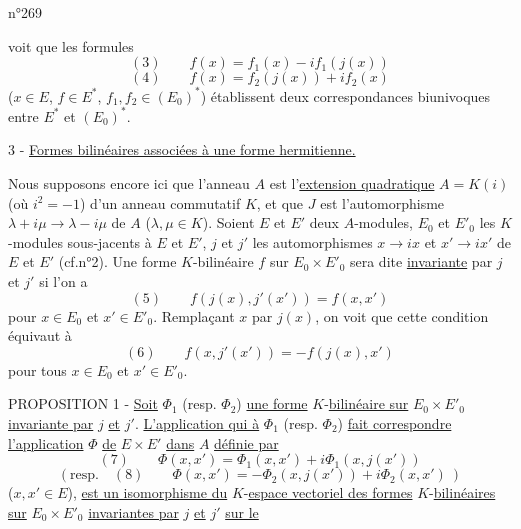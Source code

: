 \hfill n°269

voit que les formules
\[
(3)\qquad f(x)=f_1(x)-if_1(j(x))
\]
\[
(4)\qquad f(x)=f_2(j(x))+if_2(x)
\]
($x\in E$, $f\in E^*$, $f_1,f_2\in(E_0)^*$) établissent deux correspondances biunivoques entre $E^*$ et $(E_0)^*$.

3 - \uline{Formes bilinéaires associées à une forme hermitienne.}

Nous supposons encore ici que l'anneau $A$ est l'\uline{extension quadratique} $A=K(i)$ (où $i^2=-1$) d'un anneau commutatif $K$, et que $J$ est l'automorphisme $\lambda+i\mu\longrightarrow\lambda-i\mu$ de $A$ ($\lambda,\mu\in K$). Soient $E$ et $E'$ deux $A$-modules, $E_0$ et $E'_0$ les $K$-modules sous-jacents à $E$ et $E'$, $j$ et $j'$ les automorphismes $x\longrightarrow ix$ et $x'\longrightarrow ix'$ de $E$ et $E'$ (cf.n°2). Une forme $K$-bilinéaire $f$ sur $E_0\times E'_0$ sera dite \uline{invariante} par $j$ et $j'$ si l'on a
\[
(5)\qquad f(j(x),j'(x'))=f(x,x')
\]
pour $x\in E_0$ et $x'\in E'_0$. Remplaçant $x$ par $j(x)$, on voit que cette condition équivaut à
\[
(6)\qquad f(x,j'(x'))=-f(j(x),x')
\]
pour tous $x\in E_0$ et $x'\in E'_0$.

PROPOSITION 1 - \uline{Soit} $\Phi_1$ (resp. $\Phi_2$) \uline{une forme} $K$-\uline{bilinéaire sur} $E_0\times E'_0$ \uline{invariante par} $j$ \uline{et} $j'$. \uline{L'application qui à} $\Phi_1$ (resp. $\Phi_2$) \uline{fait correspondre l'application} $\Phi$ \uline{de} $E\times E'$ \uline{dans} $A$ \uline{définie par}
\[
(7)\qquad\Phi(x,x')=\Phi_1(x,x')+i\Phi_1(x,j(x'))
\]
\[
(\text{resp.}\quad(8)\qquad\Phi(x,x')=-\Phi_2(x,j(x'))+i\Phi_2(x,x')\ )
\]
($x,x'\in E$), \uline{est un isomorphisme du} $K$-\uline{espace vectoriel des formes} $K$-\uline{bilinéaires sur} $E_0\times E'_0$ \uline{invariantes par} $j$ \uline{et} $j'$ \uline{sur le}

